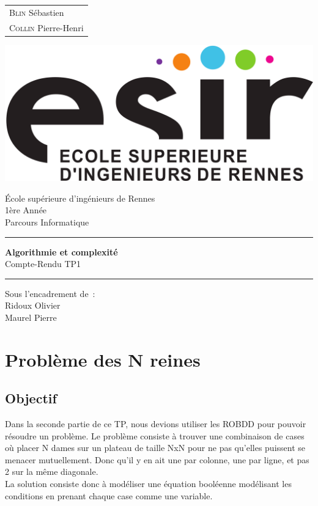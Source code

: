 \documentclass{article}
\begin{document}
\begin{titlepage}
	\vspace{-20px}
	\begin{tabular}{l}
		\textsc{Blin} S\'ebastien\\
		\textsc{Collin} Pierre-Henri
	\end{tabular}
	\hfill \vspace{10px}\includegraphics[scale=0.1]{esir.png}\\
	\vfill
	\begin{center}
		\Huge{\'Ecole sup\'erieure d'ing\'enieurs de Rennes}\\
		\vspace{1cm}
		\LARGE{1\`ere Ann\'ee}\\
		\large{Parcours Informatique}\\
		\vspace{0.5cm}\hrule\vspace{0.5cm}
		\LARGE{\textbf{Algorithmie et complexité}}\\
		\Large{Compte-Rendu TP1}
		\vspace{0.5cm}\hrule
		\vfill
		\vfill
	\end{center}
	\begin{flushleft}
		\Large{Sous l'encadrement de~:}\\
		\vspace{0.2cm}
		\large{{Ridoux} Olivier}\\
		\large{{Maurel} Pierre}
	\end{flushleft}
	\vfill
\end{titlepage}


\section{Problème des N reines}
\subsection{Objectif}
Dans la seconde partie de ce TP, nous devions utiliser les ROBDD pour pouvoir résoudre un problème. Le problème consiste à trouver une combinaison de cases où placer N dames sur un plateau de taille NxN pour ne pas qu'elles puissent se menacer mutuellement. Donc qu'il y en ait une par colonne, une par ligne, et pas 2 sur la même diagonale.\\
La solution consiste donc à modéliser une équation booléenne modélisant les conditions en prenant chaque case comme une variable.
\end{document}

